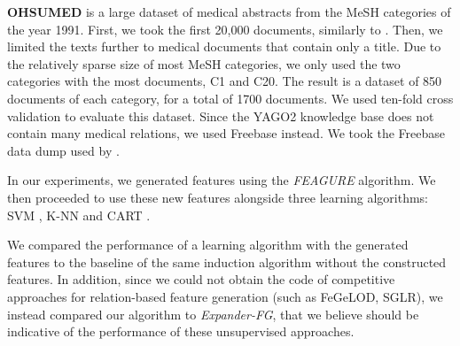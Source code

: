 \documentclass[twoside,11pt]{article}
\theoremstyle{definition}
\begin{document}



\textbf{OHSUMED} \cite{hersh1994ohsumed} is a large dataset of medical abstracts from the MeSH categories of the year 1991. 
First, we took the first 20,000 documents, similarly to \cite{joachims1998text}.
Then, we limited the texts further to medical documents that contain only a title. %
Due to the relatively sparse size of most MeSH categories, we only used the two categories with the most documents, C1 and C20. %
The result is a dataset of 850 documents of each category, for a total of 1700 documents.
We used ten-fold cross validation to evaluate this dataset.
Since the YAGO2 knowledge base does not contain many medical relations, we used Freebase instead. We took the Freebase data dump used by \cite{bast2014easy}. 

 In our experiments, we generated features using the \emph{FEAGURE} algorithm. We then proceeded to use these new features alongside three learning algorithms: SVM \cite{cortes1995support}, K-NN \cite{fix1951discriminatory} and CART \cite{breiman1984classification}.
 
 We compared the performance of a learning algorithm with the generated features to the baseline of the same induction algorithm without the constructed features.
 In addition, since we could not obtain the code of competitive approaches for relation-based feature generation (such as FeGeLOD, SGLR), we instead compared our algorithm to \emph{Expander-FG}, that we believe should be indicative of the performance of these unsupervised approaches.
\end{document}
